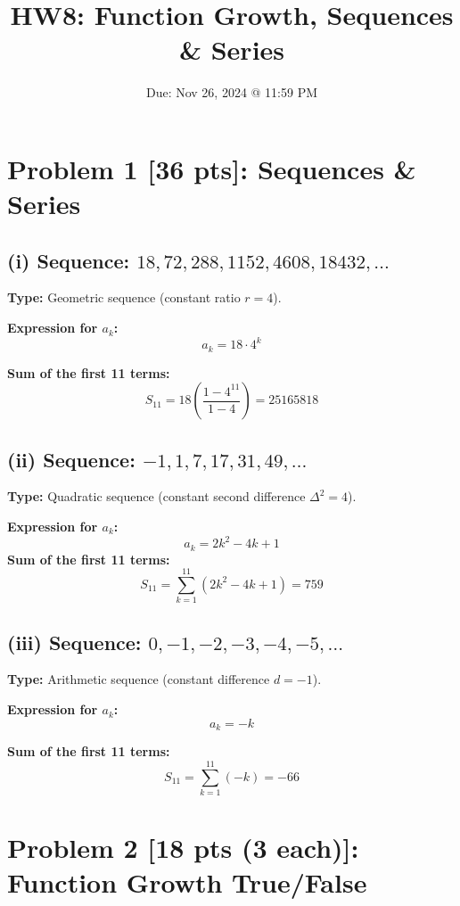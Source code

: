 \documentclass[10pt]{article}
\title{HW8: Function Growth, Sequences \& Series}
\author{}
\date{Due: Nov 26, 2024 @ 11:59 PM}
\begin{document}
\maketitle

\newpage

\section*{Problem 1 [36 pts]: Sequences \& Series}

\subsection*{(i) Sequence: \( 18, 72, 288, 1152, 4608, 18432, \dots \)}

\textbf{Type:} Geometric sequence (constant ratio \( r = 4 \)).

\textbf{Expression for \( a_k \):}
\[
a_k = 18 \cdot 4^k
\]

\textbf{Sum of the first 11 terms:}
\[
S_{11} = 18 (\frac{1 - 4^{11}}{1 - 4}) = 25165818
\]

\subsection*{(ii) Sequence: \( -1, 1, 7, 17, 31, 49, \dots \)}

\textbf{Type:} Quadratic sequence (constant second difference \( \Delta^2 = 4 \)).

\textbf{Expression for \( a_k \):}
\[
a_k = 2k^2 - 4k + 1
\]
\textbf{Sum of the first 11 terms:}
\[
S_{11}=\sum_{k=1}^{11} (2k^2 - 4k + 1) = 759
\]

\subsection*{(iii) Sequence: \( 0, -1, -2, -3, -4, -5, \dots \)}

\textbf{Type:} Arithmetic sequence (constant difference \( d = -1 \)).

\textbf{Expression for \( a_k \):}
\[
a_k = -k
\]

\textbf{Sum of the first 11 terms:}
\[
S_{11} = \sum_{k=1}^{11} (-k) = -66
\]

\newpage

\section*{Problem 2 [18 pts (3 each)]: Function Growth True/False}
\end{document}

